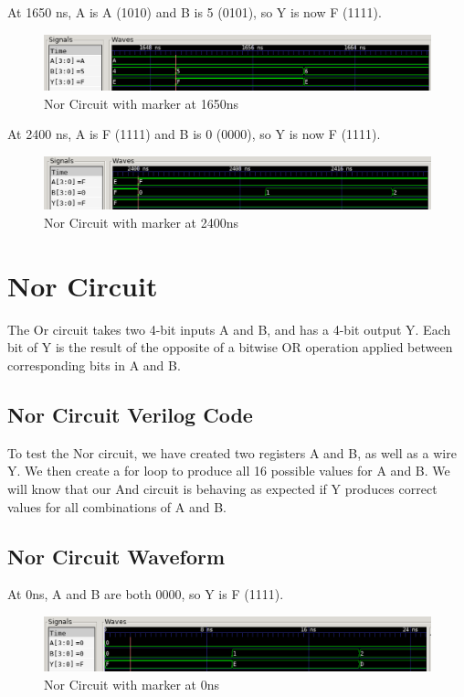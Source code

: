 \documentclass[12pt]{article}
\begin{document}
At 1650 ns, A is A (1010) and B is 5 (0101), so Y is now F (1111).
\begin{figure}[H]
    \centering
    \includegraphics[width = 1.0\textwidth]{Or/or_wave1.PNG}
    \caption{Nor Circuit with marker at 1650ns}
    \label{fig:enter-label}
\end{figure}

At 2400 ns, A is F (1111) and B is 0 (0000), so Y is now F (1111).
\begin{figure}[H]
    \centering
    \includegraphics[width = 1.0\textwidth]{Or/or_wave2.PNG}
    \caption{Nor Circuit with marker at 2400ns}
    \label{fig:enter-label}
\end{figure}

 \section{Nor Circuit}
 The Or circuit takes two 4-bit inputs A and B, and has a 4-bit output Y. Each bit of Y is the result of the opposite of a bitwise OR operation applied between corresponding bits in A and B.

\subsection{Nor Circuit Verilog Code}


To test the Nor circuit, we have created two registers A and B, as well as a wire Y. We then create a for loop to produce all 16 possible values for A and B. We will know that our And circuit is behaving as expected if Y produces correct values for all combinations of A and B. 

\subsection{Nor Circuit Waveform}

At 0ns, A and B are both 0000, so Y is F (1111).
\begin{figure}[H]
    \centering
    \includegraphics[width = 1.0\textwidth]{Nor/nor_wave.PNG}
    \caption{Nor Circuit with marker at 0ns}
    \label{fig:enter-label}
\end{figure}
\end{document}
